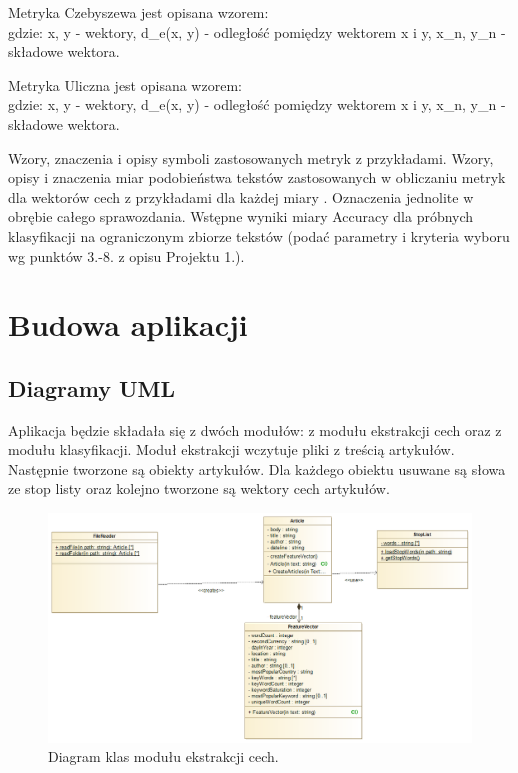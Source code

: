\documentclass{classrep}
\begin{document}
Metryka Czebyszewa jest opisana wzorem: 
\begin{equation}  \end{equation}
gdzie: x, y - wektory, d_e(x, y) - odległość pomiędzy wektorem x i y, x_n, y_n - składowe wektora. 

Metryka Uliczna jest opisana wzorem: 
\begin{equation}  \end{equation}
gdzie: x, y - wektory, d_e(x, y) - odległość pomiędzy wektorem x i y, x_n, y_n - składowe wektora. 





Wzory, znaczenia i opisy symboli zastosowanych metryk z
przykładami. Wzory, opisy i znaczenia miar
podobieństwa tekstów zastosowanych w obliczaniu metryk dla wektorów cech z
przykładami dla każdej miary \cite{niewiadomski08}.  Oznaczenia jednolite w obrębie całego sprawozdania.  Wstępne wyniki miary Accuracy dla próbnych klasyfikacji na ograniczonym zbiorze tekstów (podać parametry i kryteria
wyboru wg punktów 3.-8. z opisu Projektu 1.). \\ 

\section{Budowa aplikacji}
\subsection{Diagramy UML}

Aplikacja będzie składała się z dwóch modułów: z modułu ekstrakcji cech oraz z modułu klasyfikacji. Moduł ekstrakcji wczytuje pliki z treścią artykułów. Następnie tworzone są obiekty artykułów. Dla każdego obiektu usuwane są słowa ze stop listy oraz kolejno tworzone są wektory cech artykułów. 

\begin{figure}[h!]
 \centering
 \includegraphics[width=14cm]{Ekstrakcja.png}
 \vspace{-0.3cm}
 \caption{Diagram klas modułu ekstrakcji cech. }
 \label{rysunek do eksperymentu 1 wariantu 1}
\end{figure}
\end{document}
